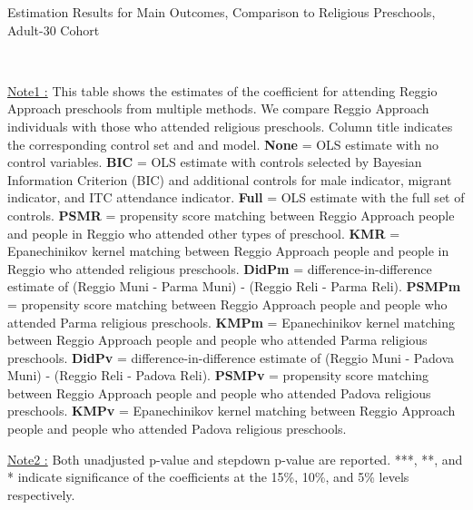 \begin{table}[H] \caption{Estimation Results for Main Outcomes, Comparison to Religious Preschools, Adult-30 Cohort} \label{ols-M-adult30-reg-reli}
\scalebox{0.59}{}
\vspace{1ex} \\
\footnotesize\raggedright{\underline{Note1 :} This table shows the estimates of the coefficient for attending Reggio Approach preschools from multiple methods. We compare Reggio Approach individuals with those who attended religious preschools. Column title indicates the corresponding control set and and model. \textbf{None} = OLS estimate with no control variables. \textbf{BIC} = OLS estimate with controls selected by Bayesian Information Criterion (BIC) and additional controls for male indicator, migrant indicator, and ITC attendance indicator. \textbf{Full} = OLS estimate with the full set of controls. \textbf{PSMR} =  propensity score matching between Reggio Approach people and people in Reggio who attended other types of preschool. \textbf{KMR} = Epanechinikov kernel matching between Reggio Approach people and people in Reggio who attended religious preschools. \textbf{DidPm} = difference-in-difference estimate of (Reggio Muni - Parma Muni) - (Reggio Reli - Parma Reli). \textbf{PSMPm} = propensity score matching between Reggio Approach people and people who attended Parma religious preschools. \textbf{KMPm} = Epanechinikov kernel matching between Reggio Approach people and people who attended Parma religious preschools. \textbf{DidPv} = difference-in-difference estimate of (Reggio Muni - Padova Muni) - (Reggio Reli - Padova Reli). \textbf{PSMPv} = propensity score matching between Reggio Approach people and people who attended Padova religious preschools. \textbf{KMPv} = Epanechinikov kernel matching between Reggio Approach people and people who attended Padova religious preschools.} 

\footnotesize\raggedright{\underline{Note2 :} Both unadjusted p-value and stepdown p-value are reported. ***, **, and * indicate significance of the coefficients at the 15\%, 10\%, and 5\% levels respectively.}

\end{table}

